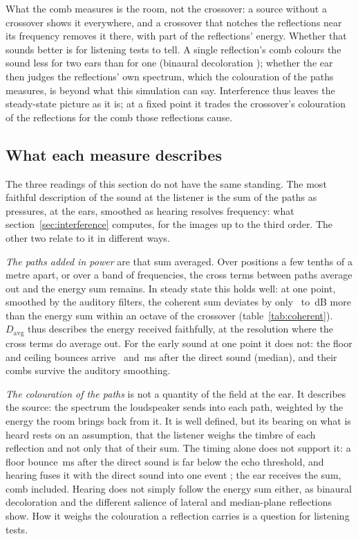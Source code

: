 \documentclass[11pt,a4paper]{article}
\begin{document}
What the comb measures is the room, not the crossover: a source without a crossover shows it
everywhere, and a crossover that notches the reflections near its frequency removes it there, with
part of the reflections' energy. Whether that sounds better is for listening tests to tell. A single
reflection's comb colours the sound less for two ears than for one (binaural decoloration
\cite{salomons1995}); whether the ear then judges the reflections' own spectrum, which the colouration
of the paths measures, is beyond what this simulation can say. Interference thus leaves the
steady-state picture as it is; at a fixed point it trades the crossover's colouration of the
reflections for the comb those reflections cause.

\subsection{What each measure describes}
\label{sec:measures}

The three readings of this section do not have the same standing. The most faithful description of
the sound at the listener is the sum of the paths as pressures, at the ears, smoothed as hearing
resolves frequency: what section~\ref{sec:interference} computes, for the images up to the third order.
The other two relate to it in different ways.

\emph{The paths added in power} are that sum averaged. Over positions a few tenths of a metre apart, or
over a band of frequencies, the cross terms between paths average out and the energy sum remains. In
steady state this holds well: at one point, smoothed by the auditory filters, the coherent sum deviates
by only \ncohSteadyGainMin\ to \ncohSteadyGainMax\,dB more than the energy sum within an octave of the
crossover (table~\ref{tab:coherent}). $D_{\mathrm{avg}}$ thus describes the energy received faithfully, at
the resolution where the cross terms do average out. For the early sound at one point it does not: the
floor and ceiling bounces arrive \ndelayFloor\ and \ndelayCeiling\,ms after the direct sound (median), and
their combs survive the auditory smoothing.

\emph{The colouration of the paths} is not a quantity of the field at the ear. It describes the
source: the spectrum the loudspeaker sends into each path, weighted by the energy the room brings back
from it. It is well defined, but its bearing on what is heard rests on an assumption, that the listener
weighs the timbre of each reflection and not only that of their sum. The timing alone does not support
it: a floor bounce \ndelayFloor\,ms after the direct sound is far below the echo threshold, and hearing
fuses it with the direct sound into one event \cite{litovsky1999}; the ear receives the sum, comb
included. Hearing does not simply follow the energy sum either, as binaural decoloration
\cite{salomons1995} and the different salience of lateral and median-plane reflections
\cite{olive1989,bech1996} show. How it weighs the colouration a reflection carries is a question for
listening tests.
\end{document}
